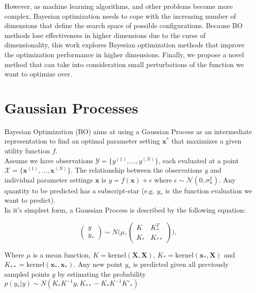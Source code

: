 However, as machine learning algorithms, and other problems become more complex, Bayesian optimization needs to cope with the increasing number of dimensions that define the search space of possible configurations.
Because BO methods lose effectiveness in higher dimensions due to the curse of dimensionality, this work  explores Bayesian optimization methods that improve the optimization performance in higher dimensions.
Finally, we propose a novel method that can take into consideration small perturbations of the function we want to optimize over.

\section{Gaussian Processes}
Bayesian Optimization (BO) aims at using a Gaussian Process as an intermediate representation to find an optimal parameter setting $\mathbf{x^*}$ that maximizes a given utility function $f$.\\

Assume we have observations $ \mathcal{Y} = \{ y^{(1)}, \ldots, y^{(N)} \}$, each evaluated at a point $ \mathcal{X} = \{  \mathbf{x}^{(1)}, \ldots, \mathbf{x}^{(N)} \}$.
The relationship between the observations $y$ and individual parameter settings $\mathbf{x}$ is $y = f \left( \mathbf{x} \right) + \epsilon$ where $\epsilon \sim  \mathcal{N} \left( 0, \sigma^2_n \right)$. Any quantity to be predicted has a subscript-star (e.g. $y_*$ is the function evaluation we want to predict).\\

In it's simplest form, a Gaussian Process is described by the following equation:

\begin{equation}
\begin{pmatrix} y \\
y_* \end{pmatrix} \sim N\Biggl(\mu,\begin{pmatrix} K & K^T_*\\
 K_* & K_{**} \end{pmatrix}\Biggr),
\end{equation}

Where $\mu$ is a mean function, $K = \text{kernel}(\mathbf{X}, \mathbf{X})$, $K_* = \text{kernel}(\mathbf{x_*}, \mathbf{X})$ and $K_{**} = \text{kernel}(\mathbf{x_*}, \mathbf{x_*})$.
Any new point $y_*$ is predicted given all previously sampled points $y$ by estimating the probability $ p(y_*|y) \sim N(K_*K^{-1}y,K_{**}-K_*K^{-1}K'_*) $\\

